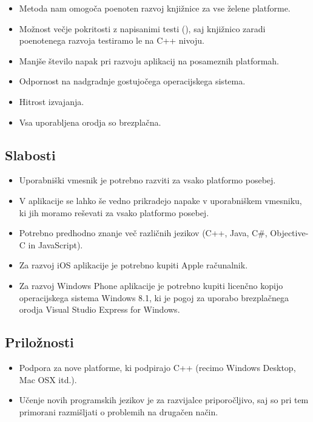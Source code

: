 \begin{itemize}
  \item Metoda nam omogoča poenoten razvoj knjižnice za vse želene platforme.
  \item Možnost večje pokritosti z napisanimi testi (), saj knjižnico zaradi poenotenega razvoja testiramo le na C++ nivoju.
  \item Manjše število napak pri razvoju aplikacij na posameznih platformah.
  \item Odpornost na nadgradnje gostujočega operacijskega sistema.
  \item Hitrost izvajanja.
  \item Vsa uporabljena orodja so brezplačna.
\end{itemize}

\subsection{Slabosti}

\begin{itemize}
  \item Uporabniški vmesnik je potrebno razviti za vsako platformo posebej.
  \item V aplikacije se lahko še vedno prikradejo napake v uporabniškem vmesniku, ki jih moramo reševati za vsako platformo posebej.
  \item Potrebno predhodno znanje več različnih jezikov (C++, Java, C\#, Objective-C in JavaScript).
  \item Za razvoj iOS aplikacije je potrebno kupiti Apple računalnik.
  \item Za razvoj Windows Phone aplikacije je potrebno kupiti licenčno kopijo operacijskega sistema Windows 8.1, ki je pogoj za uporabo brezplačnega orodja Visual Studio Express for Windows\cite{visual-studio-express}.
\end{itemize}

\subsection{Priložnosti}

\begin{itemize}
  \item Podpora za nove platforme, ki podpirajo C++ (recimo Windows Desktop, Mac OSX itd.).
  \item Učenje novih programskih jezikov je za razvijalce priporočljivo, saj so pri tem primorani razmišljati o problemih na drugačen način\cite{pragprog}.
\end{itemize}

